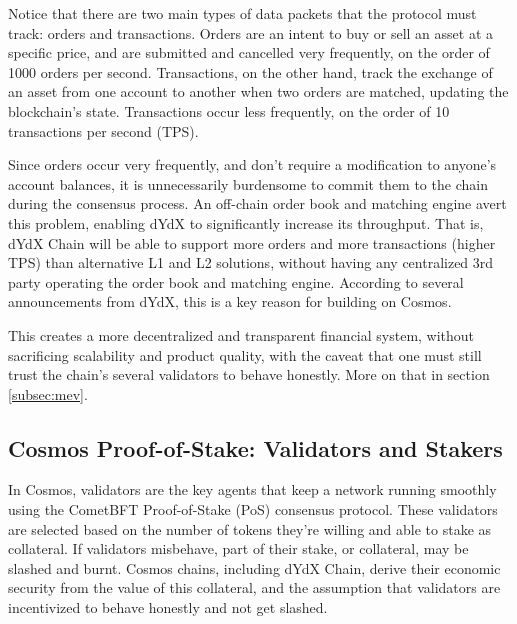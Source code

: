         Notice that there are two main types of data packets that the protocol must track: orders and transactions. Orders are an intent to buy or sell an asset at a specific price, and are submitted and cancelled very frequently, on the order of 1000 orders per second. Transactions, on the other hand, track the exchange of an asset from one account to another when two orders are matched, updating the blockchain's state. Transactions occur less frequently, on the order of 10 transactions per second (TPS). 

        Since orders occur very frequently, and don't require a modification to anyone's account balances, it is unnecessarily burdensome to commit them to the chain during the consensus process. An off-chain order book and matching engine avert this problem, enabling dYdX to significantly increase its throughput. That is, dYdX Chain will be able to support more orders and more transactions (higher TPS) than alternative L1 and L2 solutions, without having any centralized 3rd party operating the order book and matching engine. According to several announcements from dYdX, this is a key reason for building on Cosmos.

        This creates a more decentralized and transparent financial system, without sacrificing scalability and product quality, with the caveat that one must still trust the chain's several validators to behave honestly. More on that in section \ref{subsec:mev}.

    \subsection{Cosmos Proof-of-Stake: Validators and Stakers}
    
        In Cosmos, validators are the key agents that keep a network running smoothly using the CometBFT Proof-of-Stake (PoS) consensus protocol. These validators are selected based on the number of tokens they're willing and able to stake as collateral. If validators misbehave, part of their stake, or collateral, may be slashed and burnt. Cosmos chains, including dYdX Chain, derive their economic security from the value of this collateral, and the assumption that validators are incentivized to behave honestly and not get slashed.
        
